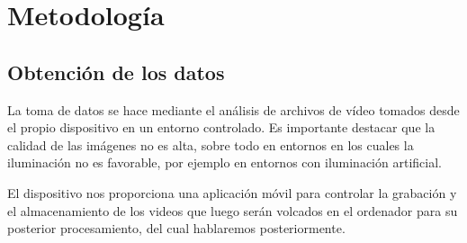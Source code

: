 
\cleardoublepage

\chapter{Metodología}
\label{metodologia}

\section{Obtención de los datos}
\label{obtencion-datos}

La toma de datos se hace mediante el análisis de archivos de vídeo tomados desde el propio dispositivo en un entorno controlado. Es importante destacar que la calidad de las imágenes no es alta, sobre todo en entornos en los cuales la iluminación no es favorable, por ejemplo en entornos con iluminación artificial. 
\medskip

El dispositivo nos proporciona una aplicación móvil para controlar la grabación y el almacenamiento de los videos que luego serán volcados en el ordenador para su posterior procesamiento, del cual hablaremos posteriormente.
\medskip


